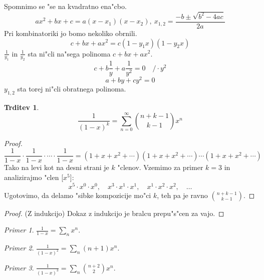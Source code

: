 \documentclass[a4paper,12pt]{article}
\theoremstyle{definition}
\newtheorem{claim}[counter]{Trditev}
\theoremstyle{remark}
\newtheorem*{ex}{Primer}
\begin{document}
Spomnimo se "se na kvadratno ena"cbo.
\[ax^2 + bx + c = a (x - x_1)(x - x_2), \ x_{1, 2} = \frac{- b \pm \sqrt{b^2 - 4ac}}{2a}\]
Pri kombinatoriki jo bomo nekoliko obrnili.
\[c + bx + ax^2 = c(1 - y_1 x)(1 - y_2 x)\]
$\frac{1}{y_1}$ in $\frac{1}{y_2}$ sta ni"cli na"sega polinoma $c + bx + ax^2$.
\[c + b\frac{1}{y} + a\frac{1}{y^2} = 0 \quad / \cdot y^2\]
\[a + by + cy^2 = 0\]
$y_{1, 2}$ sta torej ni"cli obratnega polinoma.

\begin{claim}
    \[\frac{1}{(1 - x)^k} = \sum_{n = 0}^{\infty} \binom{n + k - 1}{k - 1} x^n\]
    \label{produkt_enostavnih_vrst}
\end{claim}

\begin{proof}
    \[\frac{1}{1 - x} \cdot \frac{1}{1 - x} \cdot \cdots \cdot \frac{1}{1 - x} = (1 + x + x^2 + \cdots)(1 + x + x^2 + \cdots)\cdots(1 + x + x^2 + \cdots)\]
    Tako na levi kot na desni strani je $k$ "clenov.
    Vzemimo za primer $k = 3$ in analizirajmo "clen [$x^5$]:
    \[x^5 \cdot x^0 \cdot x^0, \quad x^3 \cdot x^1 \cdot x^1,\quad x^1 \cdot x^2 \cdot x^2, \quad \ldots \]
    Ugotovimo, da delamo "sibke kompozicije mo"ci $k$, teh pa je ravno $\binom{n + k - 1}{k - 1}$.
\end{proof}

\begin{proof}(Z indukcijo)
    Dokaz z indukcijo je bralcu prepu"s"cen za vajo.
\end{proof}

\begin{ex}
	$\frac{1}{1 - x} = \sum_n x^n$.
\end{ex}
\begin{ex}
	$\frac{1}{(1 - x)^2} = \sum_n (n + 1)x^n$.
\end{ex}
\begin{ex}
	$\frac{1}{(1 - x)^3} = \sum_n \binom{n + 2}{2} x^n$.
\end{ex}
\end{document}
